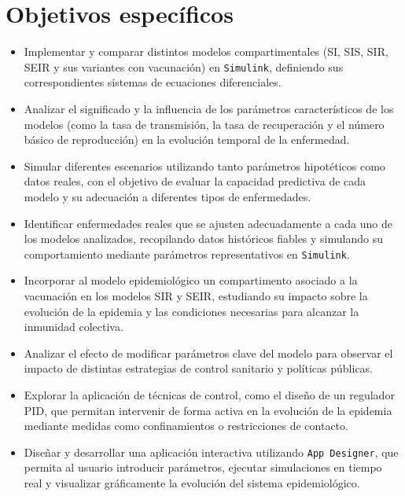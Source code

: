 \section{Objetivos específicos}
\begin{itemize}
\item Implementar y comparar distintos modelos compartimentales (SI, SIS, SIR, SEIR y sus variantes con vacunación) en \texttt{Simulink}, definiendo sus correspondientes sistemas de ecuaciones diferenciales.
\item Analizar el significado y la influencia de los parámetros característicos de los modelos (como la tasa de transmisión, la tasa de recuperación y el número básico de reproducción) en la evolución temporal de la enfermedad.
\item Simular diferentes escenarios utilizando tanto parámetros hipotéticos como datos reales, con el objetivo de evaluar la capacidad predictiva de cada modelo y su adecuación a diferentes tipos de enfermedades.
\item Identificar enfermedades reales que se ajusten adecuadamente a cada uno de los modelos analizados, recopilando datos históricos fiables y simulando su comportamiento mediante parámetros representativos en \texttt{Simulink}.
\item Incorporar al modelo epidemiológico un compartimento asociado a la vacunación en los modelos SIR y SEIR, estudiando su impacto sobre la evolución de la epidemia y las condiciones necesarias para alcanzar la inmunidad colectiva.
\item Analizar el efecto de modificar parámetros clave del modelo para observar el impacto de distintas estrategias de control sanitario y políticas públicas.
\item Explorar la aplicación de técnicas de control, como el diseño de un regulador PID, que permitan intervenir de forma activa en la evolución de la epidemia mediante medidas como confinamientos o restricciones de contacto.
\item Diseñar y desarrollar una aplicación interactiva utilizando \texttt{App Designer}, que permita al usuario introducir parámetros, ejecutar simulaciones en tiempo real y visualizar gráficamente la evolución del sistema epidemiológico.
\end{itemize}

